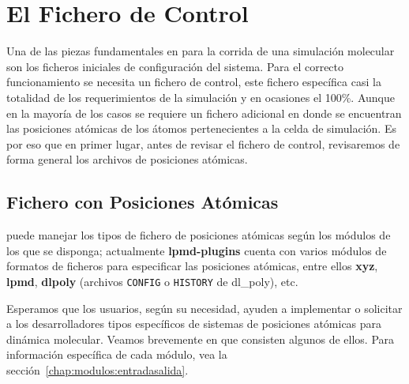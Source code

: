 \chapter{El Fichero de Control}
\label{chap:input}

Una de las piezas fundamentales en {\lpmd} para la corrida de una simulaci\'on molecular son los ficheros iniciales de configuraci\'on del sistema. Para el correcto funcionamiento se necesita un fichero de control, este fichero espec\'ifica casi la totalidad de los requerimientos de la simulaci\'on y en ocasiones el 100\%. Aunque en la mayor\'ia de los casos se requiere un fichero adicional en donde se encuentran las posiciones at\'omicas de los \'atomos pertenecientes a la celda de simulaci\'on. Es por eso que en primer lugar, antes de revisar el fichero de control, revisaremos de forma general los archivos de posiciones at\'omicas.


\section{Fichero con Posiciones At\'omicas}

{\lpmd} puede manejar los tipos de fichero de posiciones at\'omicas seg\'un los m\'odulos de los que se disponga; actualmente \textbf{lpmd-plugins} cuenta con varios m\'odulos de formatos de ficheros para especificar las posiciones at\'omicas, entre ellos \textbf{xyz}, \textbf{lpmd}, \textbf{dlpoly} (archivos \verb|CONFIG| o \verb|HISTORY| de dl\_poly), etc.


Esperamos que los usuarios, seg\'un su necesidad, ayuden a implementar o solicitar a los desarrolladores tipos espec\'ificos de sistemas de posiciones at\'omicas para din\'amica molecular. Veamos brevemente en que consisten algunos de ellos. Para informaci\'on espec\'ifica de cada m\'odulo, vea la secci\'on~\ref{chap:modulos:entradasalida}.


